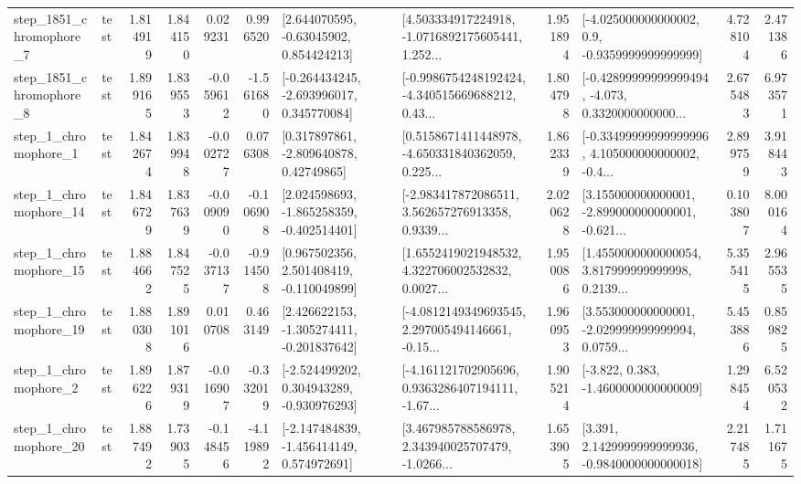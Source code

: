 \begin{tabular}{llrrrrllrlrr}
  step\_1851\_chromophore\_7 &      test &      1.814919 &    1.844150 &      0.029231 &  0.996520 &     [2.644070595, -0.63045902, 0.854424213] &  [4.503334917224918, -1.0716892175605441, 1.252... &       1.951894 &     [-4.025000000000002, 0.9, -0.9359999999999999] &            4.728104 &          2.471386 \\
  step\_1851\_chromophore\_8 &      test &      1.899165 &    1.839553 &     -0.059612 & -1.561680 &   [-0.264434245, -2.693996017, 0.345770084] &  [-0.9986754248192424, -4.340515669688212, 0.43... &       1.804798 &  [-0.42899999999999494, -4.073, 0.3320000000000... &            2.675483 &          6.973571 \\
     step\_1\_chromophore\_1 &      test &      1.842674 &    1.839948 &     -0.002727 &  0.076308 &     [0.317897861, -2.809640878, 0.42749865] &  [0.5158671411448978, -4.650331840362059, 0.225... &       1.862339 &  [-0.33499999999999996, 4.105000000000002, -0.4... &            2.899759 &          3.918443 \\
    step\_1\_chromophore\_14 &      test &      1.846729 &    1.837639 &     -0.009090 & -0.106908 &   [2.024598693, -1.865258359, -0.402514401] &  [-2.983417872086511, 3.562657276913358, 0.9339... &       2.020628 &  [3.155000000000001, -2.899000000000001, -0.621... &            0.103807 &          8.000164 \\
    step\_1\_chromophore\_15 &      test &      1.884662 &    1.847525 &     -0.037137 & -0.914508 &    [0.967502356, 2.501408419, -0.110049899] &  [1.6552419021948532, 4.322706002532832, 0.0027... &       1.950086 &  [1.4550000000000054, 3.817999999999998, 0.2139... &            5.355415 &          2.965535 \\
    step\_1\_chromophore\_19 &      test &      1.880308 &    1.891016 &      0.010708 &  0.463149 &   [2.426622153, -1.305274411, -0.201837642] &  [-4.0812149349693545, 2.297005494146661, -0.15... &       1.960953 &  [3.553000000000001, -2.029999999999994, 0.0759... &            5.453886 &          0.859825 \\
     step\_1\_chromophore\_2 &      test &      1.896226 &    1.879319 &     -0.016907 & -0.332019 &   [-2.524499202, 0.304943289, -0.930976293] &  [-4.161121702905696, 0.9363286407194111, -1.67... &       1.905214 &               [-3.822, 0.383, -1.4600000000000009] &            1.298454 &          6.520532 \\
    step\_1\_chromophore\_20 &      test &      1.887492 &    1.739035 &     -0.148456 & -4.119892 &   [-2.147484839, -1.456414149, 0.574972691] &  [3.467985788586978, 2.343940025707479, -1.0266... &       1.653905 &   [3.391, 2.1429999999999936, -0.9840000000000018] &            2.217485 &          1.711675 \\

\end{tabular}

